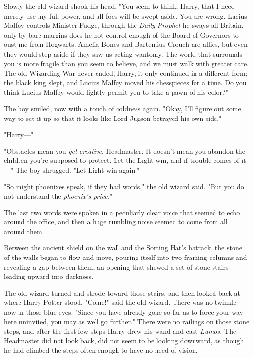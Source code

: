 Slowly the old wizard shook his head. "You seem to think, Harry, that I need
merely use my full power, and all foes will be swept aside. You are wrong.
Lucius Malfoy controls Minister Fudge, through the \emph{Daily Prophet} he
sways all Britain, only by bare margins does he not control enough of the Board
of Governors to oust me from Hogwarts. Amelia Bones and Bartemius Crouch are
allies, but even they would step aside if they saw us acting wantonly. The
world that surrounds you is more fragile than you seem to believe, and we must
walk with greater care. The old Wizarding War never ended, Harry, it only
continued in a different form; the black king slept, and Lucius Malfoy moved
his chesspieces for a time. Do you think Lucius Malfoy would lightly permit you
to take a pawn of his color?"

The boy smiled, now with a touch of coldness again. "Okay, I'll figure out some
way to set it up so that it looks like Lord Jugson betrayed his own side."

"Harry—"

"Obstacles mean you \emph{get creative}, Headmaster. It doesn't mean you
abandon the children you're supposed to protect. Let the Light win, and if
trouble comes of it—" The boy shrugged. "Let Light win again."

"So might phoenixes speak, if they had words," the old wizard said. "But you do
not understand the \emph{phoenix's price.}"

The last two words were spoken in a peculiarly clear voice that seemed to echo
around the office, and then a huge rumbling noise seemed to come from all
around them.

Between the ancient shield on the wall and the Sorting Hat's hatrack, the stone
of the walls began to flow and move, pouring itself into two framing columns
and revealing a gap between them, an opening that showed a set of stone stairs
leading upward into darkness.

The old wizard turned and strode toward those stairs, and then looked back at
where Harry Potter stood. "Come!" said the old wizard. There was no twinkle now
in those blue eyes. "Since you have already gone so far as to force your way
here uninvited, you may as well go further."
\sbreak
There were no railings on those stone steps, and after the first few steps
Harry drew his wand and cast \emph{Lumos.} The Headmaster did not look back,
did not seem to be looking downward, as though he had climbed the steps often
enough to have no need of vision.

